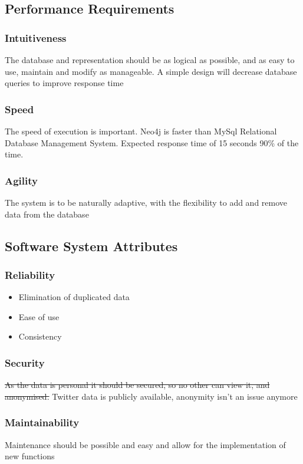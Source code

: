 \documentclass[11pt]{article}
\begin{document}
\subsection{Performance Requirements}
\subsubsection{Intuitiveness}
The database and representation should be as logical as possible, and as easy to use, maintain and modify as manageable. 
A simple design will decrease database queries to improve response time

\subsubsection{Speed}
The speed of execution is important. Neo4j is faster than MySql Relational Database Management System. Expected response time of 15 seconds 90\% of the time.

\subsubsection{Agility}
The system is to be naturally adaptive, with the flexibility to add and remove data from the database

\subsection{Software System Attributes}
\subsubsection{Reliability}
\begin{itemize}
\item Elimination of duplicated data
\item Ease of use
\item Consistency
\end{itemize}

\subsubsection{Security}
\st{As the data is personal it should be secured, so no other can view it, and anonymised.}
Twitter data is publicly available, anonymity isn't an issue anymore


\subsubsection{Maintainability}
Maintenance should be possible and easy and allow for the implementation of new functions
\end{document}
